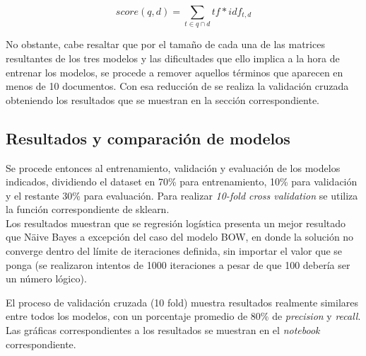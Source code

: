 \begin{equation}
    score(q,d) = \sum_{t\in q \cap d} tf * idf_{t,d}
\end{equation}

No obstante, cabe resaltar que por el tamaño de cada una de las matrices resultantes de los tres modelos y las dificultades que ello implica a la hora de entrenar los modelos, se procede a remover aquellos términos que aparecen en menos de 10 documentos. Con esa reducción de se realiza la validación cruzada obteniendo los resultados que se muestran en la sección correspondiente.

\subsection{Resultados y comparación de modelos}
Se procede entonces al entrenamiento, validación y evaluación de los modelos indicados, dividiendo el dataset en 70\% para entrenamiento, 10\% para validación y el restante 30\% para evaluación. Para realizar \textit{10-fold cross validation} se utiliza la función correspondiente de sklearn.\\

Los resultados muestran que se regresión logística presenta un mejor resultado que Näive Bayes a excepción del caso del modelo BOW, en donde la solución no converge dentro del límite de iteraciones definida, sin importar el valor que se ponga (se realizaron intentos de 1000 iteraciones a pesar de que 100 debería ser un número lógico).

El proceso de validación cruzada (10 fold) muestra resultados realmente similares entre todos los modelos, con un porcentaje promedio de 80\% de \textit{precision} y \textit{recall}. Las gráficas correspondientes a los resultados se muestran en el \textit{notebook} correspondiente. 